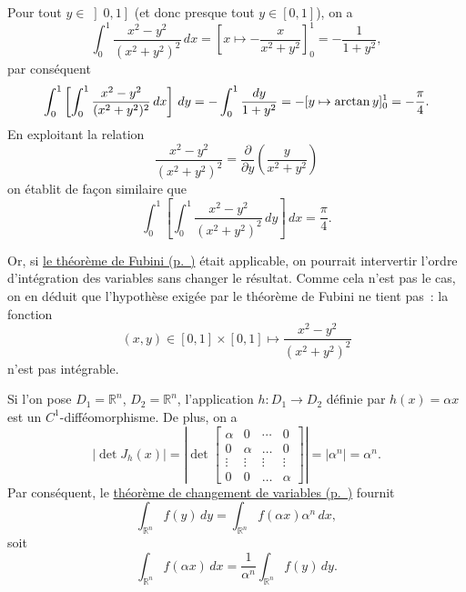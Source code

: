 \label{II-answer-fubini-counter-example}
Pour tout \(y \in \left]0,1\right]\) (et donc presque tout
\(y \in [0, 1]\)), on a \[
\int_0^1 \frac{x^2 - y^2}{(x^2+y^2)^2} \, dx 
= 
\left[x \mapsto - \frac{x}{x^2+y^2} \right]_0^1
= 
- \frac{1}{1+y^2},
\] par conséquent \[
\int_0^1 \left[ \int_0^1 \frac{x^2 - y^2}{(x^2+y^2)^2} \, dx \right] \, dy
= - \int_0^1 \frac{dy}{1+y^2} \\
= - [y \mapsto \arctan y]_0^1
= - \frac{\pi}{4}.
\] En exploitant la relation \[
\frac{x^2 - y^2}{(x^2+y^2)^2} = \frac{\partial}{\partial y} \left(\frac{y}{x^2+y^2}\right) 
\] on établit de façon similaire que \[
\int_0^1 \left[ \int_0^1 \frac{x^2 - y^2}{(x^2+y^2)^2} \, dy \right] \, dx
= \frac{\pi}{4}.
\]

Or, si \protect\hyperref[II-fubiniproba]{le théorème de
Fubini (p.~\pageref*{II-fubiniproba})} était applicable, on pourrait
intervertir l'ordre d'intégration des variables sans changer le
résultat. Comme cela n'est pas le cas, on en déduit que l'hypothèse
exigée par le théorème de Fubini ne tient pas~: la fonction \[
(x, y) \in [0,1] \times [0,1] \mapsto \frac{x^2 - y^2}{(x^2+y^2)^2}
\] n'est pas intégrable.

\label{II-answer-h}
Si l'on pose \(D_1 = \mathbb{R}^n\), \(D_2 = \mathbb{R}^n\),
l'application \(h:D_1 \to D_2\) définie par \(h(x) = \alpha x\) est un
\(C^1\)-difféomorphisme. De plus, on a \[
|\det J_{h}(x)| = \left|\det \left[
  \begin{array}{cccc}
  \alpha & 0  & \cdots & 0 \\
  0 & \alpha & \dots & 0 \\
  \vdots & \vdots & \vdots & \vdots \\
  0 & 0 & \dots & \alpha
  \end{array} \right] \right|  = |\alpha^n| = \alpha^n.
\] Par conséquent, le
\protect\hyperref[II-theorem-changement-de-variables]{théorème de
changement de
variables (p.~\pageref*{II-theorem-changement-de-variables})} fournit \[
\int_{\mathbb{R}^n} f(y) \, dy = \int_{\mathbb{R}^n} f(\alpha x) \alpha^n \, dx,
\] soit \[
\int_{\mathbb{R}^n} f(\alpha x) \, dx = \frac{1}{\alpha^n} \int_{\mathbb{R}^n} f(y) \, dy.
\]

